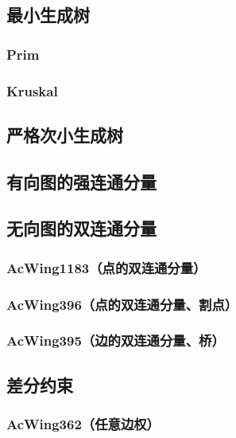 \documentclass[12pt,a4paper]{article}
\begin{document}
\subsection{最小生成树}
\subsubsection{Prim}

\subsubsection{Kruskal}

\subsection{严格次小生成树}

\subsection{有向图的强连通分量}

\subsection{无向图的双连通分量}
\subsubsection{AcWing1183（点的双连通分量）}

\subsubsection{AcWing396（点的双连通分量、割点）}

\subsubsection{AcWing395（边的双连通分量、桥）}

\subsection{差分约束}
\subsubsection{AcWing362（任意边权）}
\begin{spacing}{1.5}

\end{spacing}

\end{document}
